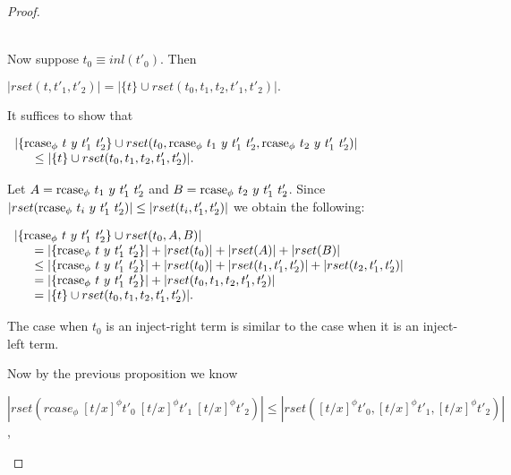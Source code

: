 \begin{proof}
\begin{itemize}
\begin{itemize}
    \ \\
    Now suppose $t_0 \equiv inl(t'_0)$.  Then
    \begin{center}
      \begin{math}
        |rset(t, t'_1, t'_2)| = |\{t\} \cup rset(t_0, t_1, t_2, t'_1, t'_2)|.
      \end{math}
    \end{center}
    It suffices to show that 
    \begin{center}
      \begin{math}
        \begin{array}{lll}
          |\{\mbox{rcase}_{\phi}\ t\ y\ t'_1\ t'_2\} \cup
          rset(t_0,\mbox{rcase}_{\phi}\ t_1\ y\ t'_1\ t'_2,\mbox{rcase}_{\phi}\ t_2\ y\ t'_1\ t'_2)|\\
          \text{\ \ \ \ } \leq |\{t\} \cup rset(t_0, t_1, t_2, t'_1, t'_2)|.
        \end{array}
      \end{math}
    \end{center}
    Let $A = \mbox{rcase}_{\phi}\ t_1\ y\ t'_1\ t'_2$ and $B = \mbox{rcase}_{\phi}\ t_2\ y\ t'_1\ t'_2$. Since 
    $|rset(\mbox{rcase}_{\phi}\ t_i\ y\ t'_1\ t'_2)| \leq |rset(t_i,t'_1,t'_2)|$ we obtain the following:
    \begin{center}
      \begin{math}
        \begin{array}{lll}
          |\{\mbox{rcase}_{\phi}\ t\ y\ t'_1\ t'_2\} \cup rset(t_0,A,B)|\\
          \text{\ \ \ \ } = |\{\mbox{rcase}_{\phi}\ t\ y\ t'_1\ t'_2\}| + |rset(t_0)| + |rset(A)| + |rset(B)|\\
          \text{\ \ \ \ } \leq |\{\mbox{rcase}_{\phi}\ t\ y\ t'_1\ t'_2\}| +
          |rset(t_0)| + |rset(t_1,t'_1,t'_2)| + |rset(t_2,t'_1,t'_2)|\\
          \text{\ \ \ \ } = |\{\mbox{rcase}_{\phi}\ t\ y\ t'_1\ t'_2\}| + |rset(t_0, t_1,t_2,t'_1,t'_2)|\\
          \text{\ \ \ \ } = |\{t\} \cup rset(t_0, t_1, t_2, t'_1, t'_2)|.\\
        \end{array}
      \end{math}
    \end{center}
    The case when $t_0$ is an inject-right term is similar to the case when it is an inject-left term.
  \end{itemize}
  Now by the previous proposition we know 
  \begin{center}
    $|rset(rcase_\phi\ [t/x]^\phi t'_0\ [t/x]^\phi t'_1\ [t/x]^\phi t'_2)| \leq |rset([t/x]^\phi t'_0, [t/x]^\phi t'_1, [t/x]^\phi t'_2)|$,

\end{center}
\end{itemize}
\end{proof}
